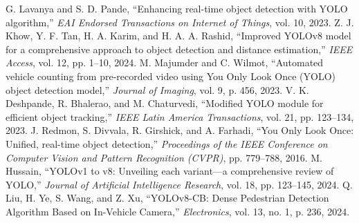 \begin{thebibliography}{00}
%
%
 G. Lavanya and S. D. Pande, ``Enhancing real-time object detection with YOLO algorithm,'' \textit{EAI Endorsed Transactions on Internet of Things}, vol. 10, 2023.
%
 Z. J. Khow, Y. F. Tan, H. A. Karim, and H. A. A. Rashid, ``Improved YOLOv8 model for a comprehensive approach to object detection and distance estimation,'' \textit{IEEE Access}, vol. 12, pp. 1--10, 2024.
%
 M. Majumder and C. Wilmot, ``Automated vehicle counting from pre-recorded video using You Only Look Once (YOLO) object detection model,'' \textit{Journal of Imaging}, vol. 9, p. 456, 2023.
%
 V. K. Deshpande, R. Bhalerao, and M. Chaturvedi, ``Modified YOLO module for efficient object tracking,'' \textit{IEEE Latin America Transactions}, vol. 21, pp. 123--134, 2023.
%
 J. Redmon, S. Divvala, R. Girshick, and A. Farhadi, ``You Only Look Once: Unified, real-time object detection,'' \textit{Proceedings of the IEEE Conference on Computer Vision and Pattern Recognition (CVPR)}, pp. 779--788, 2016.
%
 M. Hussain, ``YOLOv1 to v8: Unveiling each variant—a comprehensive review of YOLO,'' \textit{Journal of Artificial Intelligence Research}, vol. 18, pp. 123--145, 2024.
%
 Q. Liu, H. Ye, S. Wang, and Z. Xu, “YOLOv8-CB: Dense Pedestrian Detection Algorithm Based on In-Vehicle Camera,” \textit{Electronics}, vol. 13, no. 1, p. 236, 2024.
%
%
\end{thebibliography}
%
%